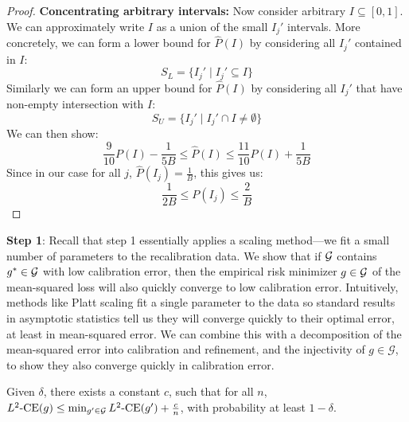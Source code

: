 \begin{proof}
\textbf{Concentrating arbitrary intervals:} Now consider arbitrary $I \subseteq [0, 1]$. We can approximately write $I$ as a union of the small $I_j'$ intervals. More concretely, we can form a lower bound for $\hat{P}(I)$ by considering all $I_j'$ contained in $I$:
\[ S_L = \{I_j' \mid I_j' \subseteq I \} \]
Similarly we can form an upper bound for $\hat{P}(I)$ by considering all $I_j'$ that have non-empty intersection with $I$:
\[ S_U = \{I_j' \mid I_j' \cap I \neq \emptyset \} \]
We can then show:
\[  \frac{9}{10} P(I) - \frac{1}{5B} \leq \hat{P}(I) \leq \frac{11}{10} P(I) + \frac{1}{5B} \]
Since in our case for all $j$, $\hat{P}(I_j) = \frac{1}{B}$, this gives us:
\[ \frac{1}{2B} \leq P(I_j) \leq \frac{2}{B} \]
\end{proof}

\textbf{Step 1}: Recall that step 1 essentially applies a scaling method---we fit a small number of parameters to the recalibration data.
We show that if $\mathcal{G}{}$ contains $g^* \in \mathcal{G}{}$ with low calibration error, then the empirical risk minimizer $g \in \mathcal{G}{}$ of the mean-squared loss will also quickly converge to low calibration error.
Intuitively, methods like Platt scaling fit a single parameter to the data so standard results in asymptotic statistics tell us they will converge quickly to their optimal error, at least in mean-squared error.
We can combine this with a decomposition of the mean-squared error into calibration and refinement, and the injectivity of $g \in \mathcal{G}$, to show they also converge quickly in calibration error.

\begin{lemma}
\label{lem:platt_scaling_bound}
Given $\delta$, there exists a constant $c$, such that for all $n$, $L^2\textup{-CE}(g) \leq \min_{g' \in \mathcal{G}{}}L^2\textup{-CE}(g') + \frac{c}{n}$, with probability at least $1 - \delta$.
\end{lemma}

